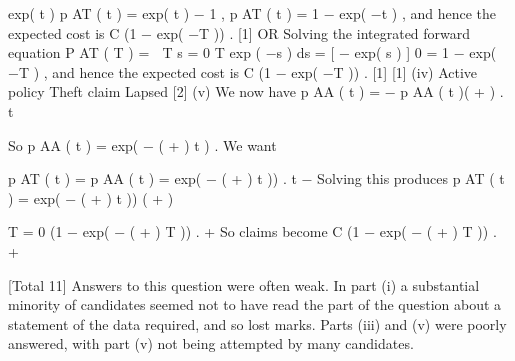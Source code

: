 exp( \mu t ) p AT ( t ) = exp( \mu t ) − 1 ,
p AT ( t ) = 1 − exp( −\mu t ) ,
and hence the expected cost is C (1 − exp( −\mu T )) .
[1]
OR
Solving the integrated forward equation
P AT ( T ) = 
T
s = 0
T
exp ( −\mu s ) \mu ds = [ − exp( \mu s ) ] 0 = 1 − exp( −\mu T ) ,
and hence the expected cost is C (1 − exp( −\mu T )) .
[1]
[1]
(iv)
\mu
Active
policy
Theft
claim
\lambda
Lapsed
[2]
(v)
We now have
\partial
p AA ( t ) = − p AA ( t )( \mu + \lambda ) .
\partial t

So p AA ( t ) = exp( − ( \mu + \lambda ) t ) .
We want

\partial
p AT ( t ) = p AA ( t ) \mu = \mu exp( − ( \mu + \lambda ) t )) .
\partial t
−\mu
Solving this produces p AT ( t ) =
exp( − ( \mu + \lambda ) t ))
( \mu + \lambda )

T
=
0
\mu
(1 − exp( − ( \mu + \lambda ) T )) .
\mu+\lambda
[1]
So claims become
\mu
C (1 − exp( − ( \mu + \lambda ) T )) .
\mu+\lambda

[Total 11]
Answers to this question were often weak. In part (i) a substantial minority of
candidates seemed not to have read the part of the question about a
statement of the data required, and so lost marks. Parts (iii) and (v) were
poorly answered, with part (v) not being attempted by many candidates.

